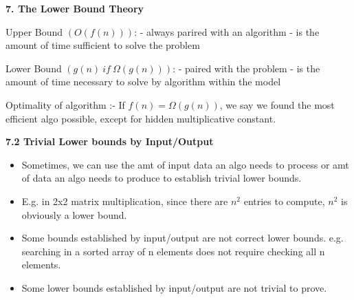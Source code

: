 \textbf{7. The Lower Bound Theory}

Upper Bound $(O(f(n)))$: - always parired with an algorithm - is the amount of time sufficient to solve the problem

Lower Bound $(g(n)\ if\ \Omega(g(n)))$: - paired with the problem - is the amount of time necessary to solve by algorithm within the model

Optimality of algorithm :- If $f(n) = \Omega(g(n))$, we say we found the most efficient algo possible, except for hidden multiplicative constant.

\textbf{7.2 Trivial Lower bounds by Input/Output}

\begin{itemize}
    \item Sometimes, we can use the amt of input data an algo needs to process or amt of data an algo needs to produce to establish trivial lower bounds.
    \item E.g. in 2x2 matrix multiplication, since there are $n^2$ entries to compute, $n^2$ is obviously a lower bound.
    \item Some bounds established by input/output are not correct lower bounds. e.g. searching in a sorted array of n elements does not require checking all n elements.
    \item Some lower bounds established by input/output are not trivial to prove.
\end{itemize}

